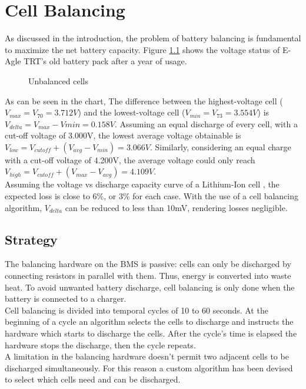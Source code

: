 \chapter{Cell Balancing}
\label{cha:balancing}
As discussed in the introduction, the problem of battery balancing is fundamental to maximize the net battery capacity. Figure \ref{fig:imbalance} shows the voltage status of E-Agle TRT's old battery pack after a year of usage.

\begin{figure}[h]
    \centering
    
    \caption{Unbalanced cells}
    \label{fig:imbalance}
\end{figure}

As can be seen in the chart, The difference between the highest-voltage cell ($V_{max} = V_{70} = 3.712V$) and the lowest-voltage cell ($V_{min} = V_{73} = 3.554V$) is $V_{delta}=V_{max}-V{min}=0.158V$. Assuming an equal discharge of every cell, with a cut-off voltage of 3.000V, the lowest average voltage obtainable is $V_{low}=V_{cutoff}+(V_{avg}-V_{min})=3.066V$. Similarly, considering an equal charge with a cut-off voltage of 4.200V, the average voltage could only reach $V_{high}=V_{cutoff}+(V_{max}-V_{avg})=4.109V$.\\
Assuming the voltage vs discharge capacity curve of a Lithium-Ion cell \cite{vtc5}, the expected loss is close to 6\%, or 3\% for each case.
With the use of a cell balancing algorithm, $V_{delta}$ can be reduced to less than 10mV, rendering losses negligible.

\section{Strategy}
The balancing hardware on the BMS is passive: cells can only be discharged by connecting resistors in parallel with them. Thus, energy is converted into waste heat. To avoid unwanted battery discharge, cell balancing is only done when the battery is connected to a charger.\\
Cell balancing is divided into temporal cycles of 10 to 60 seconds. At the beginning of a cycle an algorithm selects the cells to discharge and instructs the hardware which starts to discharge the cells. After the cycle's time is elapsed the hardware stops the discharge, then the cycle repeats.\\
A limitation in the balancing hardware doesn't permit two adjacent cells to be discharged simultaneously. For this reason a custom algorithm has been devised to select which cells need and can be discharged.

